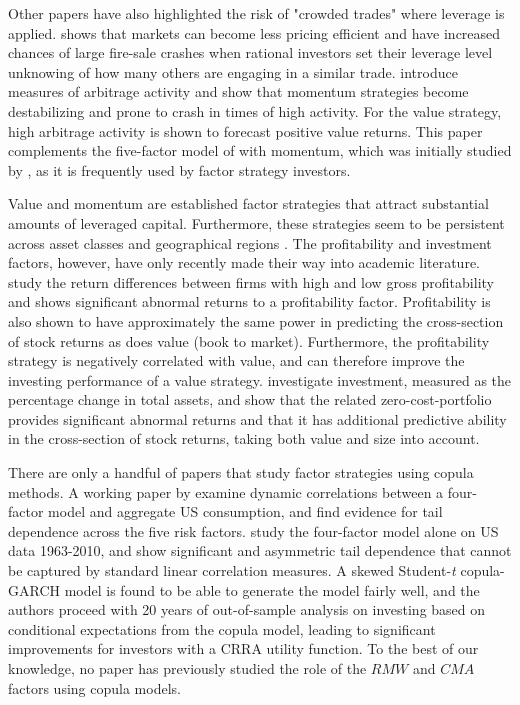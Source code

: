 Other papers have also highlighted the risk of "crowded trades" where leverage is applied. \textcite{Stein2009} shows that markets can become less pricing efficient and have increased chances of large fire-sale crashes when rational investors set their leverage level unknowing of how many others are engaging in a similar trade. \textcite{LouPolk2013} introduce measures of arbitrage activity and show that momentum strategies become destabilizing and prone to crash in times of high activity. For the value strategy, high arbitrage activity is shown to forecast positive value returns. This paper complements the five-factor model of \textcite{FF2015} with momentum, which was initially studied by \textcite{JegadeeshTitman1993}, as it is frequently used by factor strategy investors. 

Value and momentum are established factor strategies that attract substantial amounts of leveraged capital. Furthermore, these strategies seem to be persistent across asset classes and geographical regions \autocite{AsnessMoskovitzPedersen2013}. The profitability and investment factors, however, have only recently made their way into academic literature. \textcite{NovyMarx2013} study the return differences between firms with high and low gross profitability and shows significant abnormal returns to a profitability factor. Profitability is also shown to have approximately the same power in predicting the cross-section of stock returns as does value (book to market). Furthermore, the profitability strategy is negatively correlated with value, and can therefore improve the investing performance of a value strategy. \textcite{CooperGulenSchill2008} investigate investment, measured as the percentage change in total assets, and show that the related zero-cost-portfolio provides significant abnormal returns and that it has additional predictive ability in the cross-section of stock returns, taking both value and size into account.

There are only a handful of papers that study factor strategies using copula methods. A working paper by \textcite{CholleteNing2012} examine dynamic correlations between a four-factor model and aggregate US consumption, and find evidence for tail dependence across the five risk factors. \textcite{ChristoffersenLanglois2013} study the four-factor model alone on US data 1963-2010, and show significant and asymmetric tail dependence that cannot be captured by standard linear correlation measures. A skewed Student-\textit{t} copula-GARCH model is found to be able to generate the model fairly well, and the authors proceed with 20 years of out-of-sample analysis on investing based on conditional expectations from the copula model, leading to significant improvements for investors with a CRRA utility function. To the best of our knowledge, no paper has previously studied the role of the $RMW$ and $CMA$ factors using copula models.

